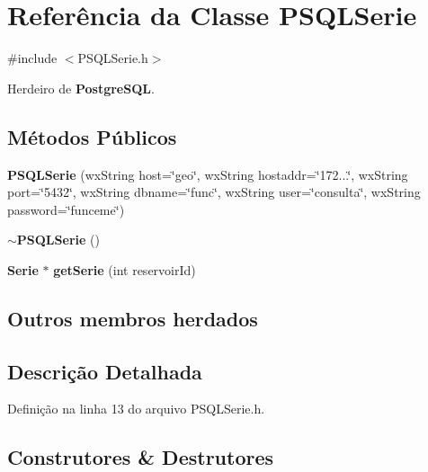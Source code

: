 \section{Referência da Classe P\+S\+Q\+L\+Serie}
\label{class_p_s_q_l_serie}


{\ttfamily \#include $<$P\+S\+Q\+L\+Serie.\+h$>$}



Herdeiro de {\bf Postgre\+S\+QL}.

\subsection*{Métodos Públicos}
\begin{DoxyCompactItemize}
\item 
{\bf P\+S\+Q\+L\+Serie} (wx\+String host=\char`\"{}geo\char`\"{}, wx\+String hostaddr=\char`\"{}172...\char`\"{}, wx\+String port=\char`\"{}5432\char`\"{}, wx\+String dbname=\char`\"{}func\char`\"{}, wx\+String user=\char`\"{}consulta\char`\"{}, wx\+String password=\char`\"{}funceme\char`\"{})
\item 
{\bf $\sim$\+P\+S\+Q\+L\+Serie} ()
\item 
{\bf Serie} $\ast$ {\bf get\+Serie} (int reservoir\+Id)
\end{DoxyCompactItemize}
\subsection*{Outros membros herdados}


\subsection{Descrição Detalhada}


Definição na linha 13 do arquivo P\+S\+Q\+L\+Serie.\+h.



\subsection{Construtores \& Destrutores}
